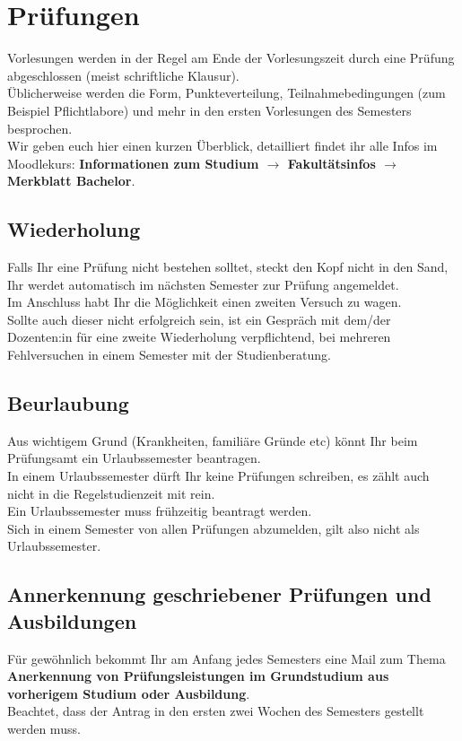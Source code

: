\chapter{Prüfungen}

Vorlesungen werden in der Regel am Ende der Vorlesungszeit durch eine Prüfung abgeschlossen (meist schriftliche Klausur).\\
Üblicherweise werden die Form, Punkteverteilung, Teilnahmebedingungen (zum Beispiel Pflichtlabore) und mehr in den ersten
Vorlesungen des Semesters besprochen.\\

Wir geben euch hier einen kurzen Überblick, detailliert  findet ihr alle Infos im Moodlekurs:
\textbf{Informationen zum Studium \(\rightarrow\) Fakultätsinfos \(\rightarrow\) Merkblatt Bachelor}.\\


\section{Wiederholung}
Falls Ihr eine Prüfung nicht bestehen solltet, steckt den Kopf nicht in den Sand, Ihr werdet automatisch im nächsten Semester zur Prüfung angemeldet.\\
Im Anschluss habt Ihr die Möglichkeit einen zweiten Versuch zu wagen.\\
Sollte auch dieser nicht erfolgreich sein, ist ein Gespräch mit dem/der Dozenten:in für eine zweite Wiederholung verpflichtend, bei mehreren Fehlversuchen
in einem Semester mit der Studienberatung.\\

\section{Beurlaubung}
Aus wichtigem Grund (Krankheiten, familiäre Gründe etc) könnt Ihr beim Prüfungsamt ein Urlaubssemester beantragen.\\
In einem Urlaubssemester dürft Ihr keine Prüfungen schreiben, es zählt auch nicht in die Regelstudienzeit mit rein.\\ 
Ein Urlaubssemester muss frühzeitig beantragt werden.\\
Sich in einem Semester von allen Prüfungen abzumelden, gilt also nicht als Urlaubssemester.\\

\section{Annerkennung geschriebener Prüfungen und Ausbildungen}
Für gewöhnlich bekommt Ihr am Anfang jedes Semesters eine Mail zum Thema
\textbf{Anerkennung von Prüfungsleistungen im Grundstudium aus vorherigem Studium oder Ausbildung}.\\
Beachtet, dass der Antrag in den ersten zwei Wochen des Semesters gestellt werden muss.\\

